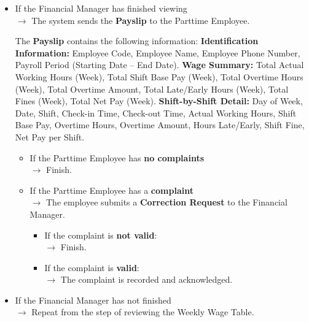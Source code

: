 \begin{itemize}
    \item If the Financial Manager has finished viewing\\
    $\rightarrow$ The system sends the \textbf{Payslip} to the Parttime Employee.

    The \textbf{Payslip} contains the following information:
        \textbf{Identification Information:} Employee Code, Employee Name, Employee Phone Number, Payroll Period (Starting Date -- End Date).
        \textbf{Wage Summary:} Total Actual Working Hours (Week), Total Shift Base Pay (Week), Total Overtime Hours (Week), Total Overtime Amount, Total Late/Early Hours (Week), Total Fines (Week), Total Net Pay (Week).
        \textbf{Shift-by-Shift Detail:} Day of Week, Date, Shift, Check-in Time, Check-out Time, Actual Working Hours, Shift Base Pay, Overtime Hours, Overtime Amount, Hours Late/Early, Shift Fine, Net Pay per Shift.

    \begin{itemize}
        \item If the Parttime Employee has \textbf{no complaints}\\
        $\rightarrow$ Finish.

        \item If the Parttime Employee has a \textbf{complaint}\\
        $\rightarrow$ The employee submits a \textbf{Correction Request} to the Financial Manager.
        \begin{itemize}
            \item If the complaint is \textbf{not valid}:\\
            $\rightarrow$ Finish.
            \item If the complaint is \textbf{valid}:\\
            $\rightarrow$ The complaint is recorded and acknowledged.
        \end{itemize}
    \end{itemize}

    \item If the Financial Manager has not finished\\
    $\rightarrow$ Repeat from the step of reviewing the Weekly Wage Table.
\end{itemize}

